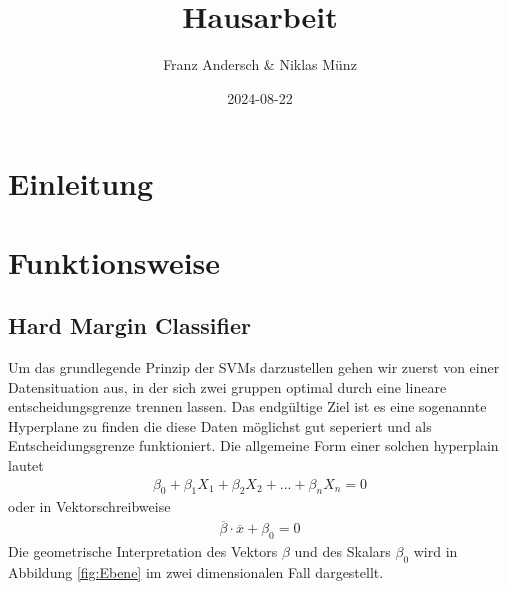 \documentclass[
]{article}
\title{Hausarbeit}
\author{Franz Andersch \& Niklas Münz}
\date{2024-08-22}
\renewcommand{\maketitle}{}
\begin{document}
\maketitle


\newpage
\tableofcontents
\thispagestyle{empty}
\clearpage
{}
\section{Einleitung}
\section{Funktionsweise}

\subsection{Hard Margin Classifier}

Um das grundlegende Prinzip der SVMs darzustellen gehen wir zuerst von
einer Datensituation aus, in der sich zwei gruppen optimal durch eine
lineare entscheidungsgrenze trennen lassen. Das endgültige Ziel ist es
eine sogenannte Hyperplane zu finden die diese Daten möglichst gut
seperiert und als Entscheidungsgrenze funktioniert. Die allgemeine Form
einer solchen hyperplain lautet \begin{align}
\beta_0+ \beta_1 X_1+\beta_2 X_2+...+\beta_n X_n=0\label{eq:hyperebene}
\end{align} oder in Vektorschreibweise \begin{align}
\overline{\beta}\cdot\overline{x}+\beta_0=0 \label{eq:hyperplanevec}
\end{align} Die geometrische Interpretation des Vektors \(\beta\) und
des Skalars \(\beta_0\) wird in Abbildung \ref{fig:Ebene} im zwei
dimensionalen Fall dargestellt.
\end{document}
